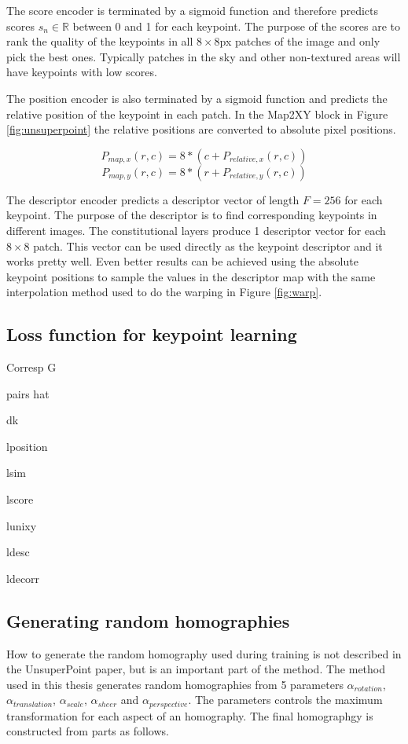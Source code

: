 The score encoder is terminated by a sigmoid function and therefore predicts scores $s_n \in \mathbb{R} $ between 0 and 1 for each keypoint. The purpose of the scores are to rank the quality of the keypoints in all $8\times 8$px patches of the image and only pick the best ones. Typically patches in the sky and other non-textured areas will have keypoints with low scores.

The position encoder is also terminated by a sigmoid function and predicts the relative position of the keypoint in each patch. In the Map2XY block in Figure \ref{fig:unsuperpoint} the relative positions are converted to absolute pixel positions.

\[
P_{map,x}(r,c) = 8 * (c + P_{relative,x}(r,c))
\]
\[
P_{map,y}(r,c) = 8 * (r + P_{relative,y}(r,c))
\]

The descriptor encoder predicts a descriptor vector of length $F=256$ for each keypoint. The purpose of the descriptor is to find corresponding keypoints in different images. The constitutional layers produce 1 descriptor vector for each $8\times 8$ patch. This vector can be used directly as the keypoint descriptor and it works pretty well. Even better results can be achieved using the absolute keypoint positions to sample the values in the descriptor map with the same interpolation method used to do the warping in Figure \ref{fig:warp}.


\subsection{Loss function for keypoint learning}

Corresp G

pairs hat

dk

lposition

lsim

lscore

lunixy

ldesc

ldecorr

\subsection{Generating random homographies}

How to generate the random homography used during training is not described in the UnsuperPoint paper, but is an important part of the method. The method used in this thesis generates random homographies from 5 parameters $\alpha_{rotation}$, $\alpha_{translation}$, $\alpha_{scale}$, $\alpha_{sheer}$ and $\alpha_{perspective}$. The parameters controls the maximum transformation for each aspect of an homography. The final homographgy is constructed from parts as follows.

